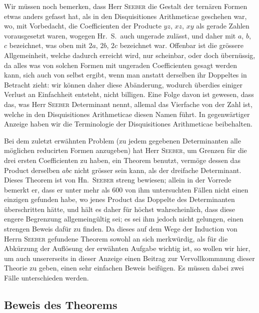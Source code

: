 \documentclass[12pt,a4paper]{article}
\begin{document}
Wir m\"{u}ssen noch bemerken, dass Herr \textsc{Seeber} die Gestalt der tern\"{a}ren Formen etwas anders gefasst hat, als in den Disquisitiones Arithmeticae geschehen war, wo, mit Vorbedacht, die Coefficienten der Producte $yz$, $xz$, $xy$ als gerade Zahlen vorausgesetzt waren, wogegen Hr.~S.~auch ungerade zul\"{a}sst, und daher mit $a$, $b$, $c$ bezeichnet, was oben mit $2a$, $2b$, $2c$ bezeichnet war. Offenbar ist die gr\"{o}ssere Allgemeinheit, welche dadurch erreicht wird, nur scheinbar, oder doch \"{u}bern\"{u}ssig, da alles was von solchen Formen mit ungeraden Coefficienten gesagt werden kann, sich auch von selbst ergibt, wenn man anstatt derselben ihr Doppeltes in Betracht zieht: wir k\"{o}nnen daher diese Ab\"{a}nderung, wodurch \"{u}berdies einiger Verlust an Einfachheit entsteht, nicht billigen. Eine Folge davon ist gewesen, dass das, was Herr \textsc{Seeber} Determinant nennt, allemal das Vierfache von der Zahl ist, welche in den Disquisitiones Arithmeticae diesen Namen f\"{u}hrt. In gegenw\"{a}rtiger Anzeige haben wir die Terminologie der Disquisitiones Arithmeticae beibehalten.

Bei dem zuletzt erw\"{a}hnten Problem (zu jedem gegebenen Determinanten alle m\"{o}glichen reducirten Formen anzugeben) hat Herr \textsc{Seeber}, um Grenzen f\"{u}r die drei ersten Coefficienten zu haben, ein Theorem benutzt, verm\"{o}ge dessen das Product derselben $abc$ nicht gr\"{o}sser sein kann, als der dreifache Determinant. Dieses Theorem ist von Hn.~\textsc{Seeber} streng bewiesen; allein in der Vorrede bemerkt er, dass er unter mehr als 600 von ihm untersuchten F\"{a}llen nicht einen einzigen gefunden habe, wo jenes Product das Doppelte des Determinanten \"{u}berschritten h\"{a}tte, und h\"{a}lt es daher f\"{u}r h\"{o}chst wahrscheinlich, dass diese engere Begrenzung allgemeing\"{u}ltig sei; es sei ihm jedoch nicht gelungen, einen strengen Beweis daf\"{u}r zu finden. Da dieses auf dem Wege der Induction von Herrn \textsc{Seeber} gefundene Theorem sowohl an sich merkw\"{u}rdig, als f\"{u}r die Abk\"{u}rzung der Aufl\"{o}sung der erw\"{a}hnten Aufgabe wichtig ist, so wollen wir hier, um auch unsererseits in dieser Anzeige einen Beitrag zur Vervollkommnung dieser Theorie zu geben, einen sehr einfachen Beweis beif\"{u}gen. Es m\"{u}ssen dabei zwei F\"{a}lle unterschieden werden.

\subsection*{Beweis des Theorems}
\end{document}
